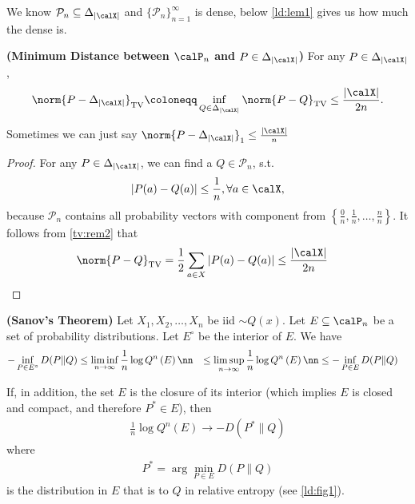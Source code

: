 \documentclass{article}
\newcommand{\TV}[1]{\norm{#1}_{\textnormal{TV}}}
\newcommand{\one}[1]{\norm{#1}_{1}}
\newcommand{\bfs}[1]{\textbf{({#1})}}
\newcommand{\typss}{\mathcal{P}_n}
\begin{document}
We know $\typss\subseteq \Delta_{|\calX|}$ and $\{\typss\}_{n=1}^{\infty}$ is dense, below \cref{ld:lem1} gives us how much the dense is.  
\begin{lema}{\bfs{Minimum Distance between $\calP_n$ and $P\in\Delta_{|\calX|}$}}\label{ld:lem1}
For any $P \in \Delta_{|\calX|}$,
\begin{align*}
\TV{P-\Delta_{|\calX|}} \coloneqq \inf _{Q \in\Delta_{|\calX|}} \TV{P-Q}\leq \frac{| \calX |}{2n }.
\end{align*}
\end{lema}
\begin{rema}
Sometimes we can just say $\one{P-\Delta_{|\calX|}}\leq \frac{| \calX |}{n }$
\end{rema}
\begin{proof}
 For any $P \in \Delta_{|\calX|}$, we can find a $Q \in \typss$, s.t.
\begin{align*}
|P(a)-Q(a)| \leq \frac{1}{n}, \forall a \in \calX ,
\end{align*}
because $\typss$ contains all probability vectors with component from $\left\{\frac{0}{n}, \frac{1}{n}, \ldots, \frac{n}{n}\right\}$. It follows from \cref{tv:rem2} that 
\begin{align*}
 \TV{P-Q} &=\frac{1}{2} \sum_{a \in X }|P(a)-Q(a)| \leq \frac{| \calX |}{2 n}
\end{align*}
\end{proof}


\begin{thma}{\bfs{Sanov's Theorem}}\label{ld:thm1}
Let $X_{1}, X_{2}, \ldots, X_{n}$ be \gls{iid} $\sim Q(x) .$ Let $E \subseteq \calP_n$ be a set of probability distributions. Let $E^{\circ}$ be the interior of $E$. We have
\begin{align}
-\inf _{P \in E^{\circ}} D(P \| Q) & \leq \liminf _{n \rightarrow \infty} \frac{1}{n} \log Q^n \left( E\right) \nn
& \leq \limsup _{n \rightarrow \infty} \frac{1}{n} \log Q^n\left( E\right) \nn
& \leq-\inf _{P \in E} D(P \| Q) 
\end{align}

If, in addition, the set $E$ is the closure of its interior (which implies $E$ is closed and compact, and therefore $P^{*}\in E$), then
\begin{align*}
\frac{1}{n} \log Q^{n}(E) \rightarrow-D\left(P^{*} \| Q\right)
\end{align*}
where
\begin{align}
P^{*}=\arg \min _{P \in E} D(P \| Q) \label{ld:eq1}
\end{align}
is the distribution in $E$ that is  to $Q$ in relative entropy (see \cref{ld:fig1}). 

\end{thma}
\end{document}
